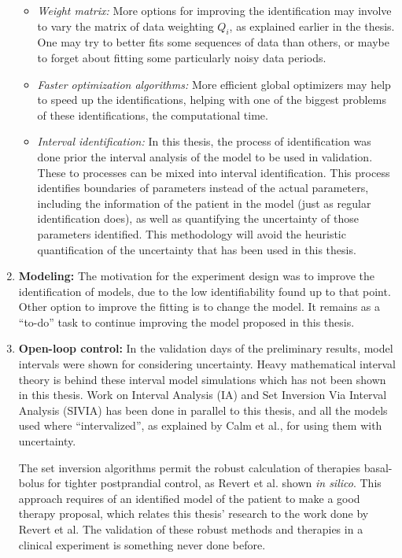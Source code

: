\begin{enumerate}
\begin{itemize}
		\item \textit{Weight matrix:} More options for improving the identification may involve to vary the matrix of data weighting $Q_{i}$, as explained earlier in the thesis. One may try to better fits some sequences of data than others, or maybe to forget about fitting some particularly noisy data periods.
		\item \textit{Faster optimization algorithms:} More efficient global optimizers may help to speed up the identifications, helping with one of the biggest problems of these identifications, the computational time.
		\item \textit{Interval identification:} In this thesis, the process of identification was done prior the interval analysis of the model to be used in validation. These to processes can be mixed into interval identification. This process identifies boundaries of parameters instead of the actual parameters, including the information of the patient in the model (just as regular identification does), as well as quantifying the uncertainty of those parameters identified. This methodology will avoid the heuristic quantification of the uncertainty that has been used in this thesis.
	\end{itemize}
	\item \textbf{Modeling:} The motivation for the experiment design was to improve the identification of models, due to the low identifiability found up to that point. Other option to improve the fitting is to change the model. It remains as a ``to-do'' task to continue improving the model proposed in this thesis.
	\item \textbf{Open-loop control:} In the validation days of the preliminary results, model intervals were shown for considering uncertainty. Heavy mathematical interval theory is behind these interval model simulations which has not been shown in this thesis. Work on Interval Analysis (IA) and Set Inversion Via Interval Analysis (SIVIA) has been done in parallel to this thesis, and all the models used where ``intervalized'', as explained by Calm et al.\cite{calm2007prediction}, for using them with uncertainty.

The set inversion algorithms permit the robust calculation of therapies basal-bolus for tighter postprandial control, as Revert et al. shown \cite{anaATTD2010} \textit{in silico}. This approach requires of an identified model of the patient to make a good therapy proposal, which relates this thesis' research to the work done by Revert et al. The validation of these robust methods and therapies in a clinical experiment is something never done before.


\end{enumerate}
